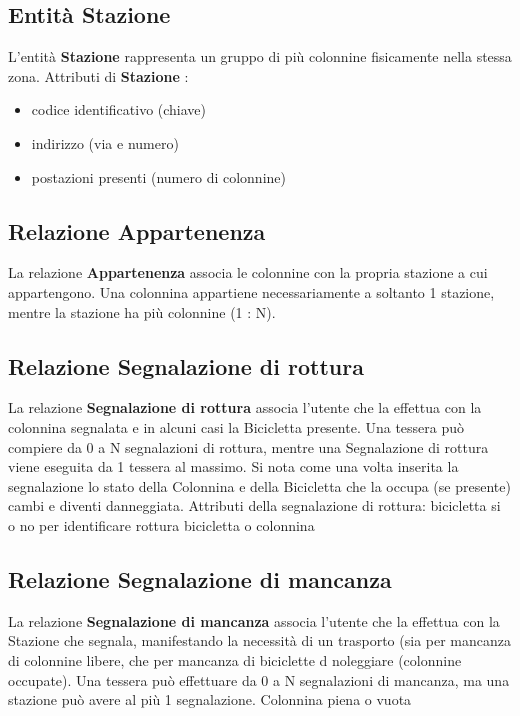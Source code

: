 \documentclass[a4paper,twoside]{article}
\begin{document}
\subsection{Entità Stazione}
L'entità \textbf{Stazione} rappresenta un gruppo di più colonnine fisicamente nella stessa zona.\newline
Attributi di \textbf{Stazione} :
\begin{itemize}
 \item codice identificativo (chiave)
 \item indirizzo (via e numero)
 \item postazioni presenti (numero di colonnine)
 \end{itemize}

\subsection{Relazione Appartenenza}
La relazione \textbf{Appartenenza} associa le colonnine con la propria stazione a cui appartengono.\newline
Una colonnina appartiene necessariamente a soltanto 1 stazione, mentre la stazione ha più colonnine (1 : N).

\subsection{Relazione Segnalazione di rottura}
La relazione \textbf{Segnalazione di rottura} associa l'utente che la effettua con la colonnina segnalata e in alcuni casi la Bicicletta presente.\newline
Una tessera può compiere da 0 a N segnalazioni di rottura, mentre una Segnalazione di rottura viene eseguita da 1 tessera al massimo.\newline
Si nota come una volta inserita la segnalazione lo stato della Colonnina e della Bicicletta che la occupa (se presente) cambi e diventi danneggiata.\newline
Attributi della segnalazione di rottura: bicicletta si o no per identificare rottura bicicletta o colonnina

\subsection{Relazione Segnalazione di mancanza}
La relazione \textbf{Segnalazione di mancanza} associa l'utente che la effettua con la Stazione che segnala, manifestando la necessità di un trasporto (sia per mancanza di colonnine libere, che per mancanza di biciclette d noleggiare (colonnine occupate).\newline
Una tessera può effettuare da 0 a N segnalazioni di mancanza, ma una stazione può avere al più 1 segnalazione.\newline
Colonnina piena o vuota
\end{document}
